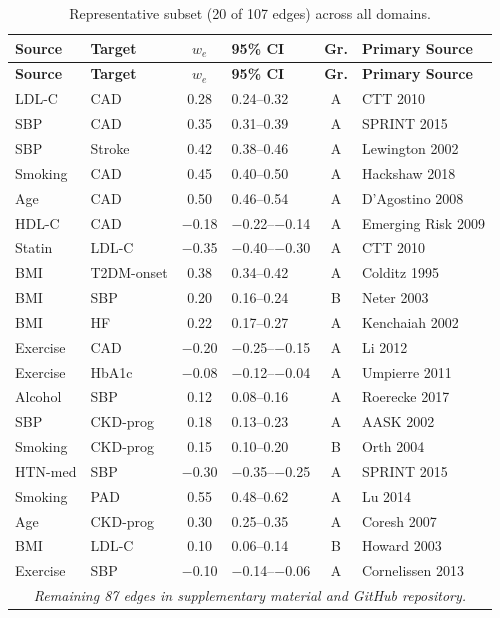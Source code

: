 \documentclass[runningheads]{llncs}
\begin{document}
{\footnotesize
\renewcommand{\arraystretch}{1.05}
\begin{longtable}{@{}p{2.0cm}p{2.0cm}cp{1.4cm}cp{2.8cm}@{}}
\caption{Representative subset (20 of 107 edges) across all domains.}\label{tab:edges}\\
\toprule
\textbf{Source} & \textbf{Target} & \textbf{$w_e$} & \textbf{95\% CI} & \textbf{Gr.} & \textbf{Primary Source} \\
\midrule
\endfirsthead
\toprule
\textbf{Source} & \textbf{Target} & \textbf{$w_e$} & \textbf{95\% CI} & \textbf{Gr.} & \textbf{Primary Source} \\
\midrule
\endhead
\bottomrule
\endlastfoot
LDL-C & CAD & 0.28 & 0.24--0.32 & A & CTT 2010 \\
SBP & CAD & 0.35 & 0.31--0.39 & A & SPRINT 2015 \\
SBP & Stroke & 0.42 & 0.38--0.46 & A & Lewington 2002 \\
Smoking & CAD & 0.45 & 0.40--0.50 & A & Hackshaw 2018 \\
Age & CAD & 0.50 & 0.46--0.54 & A & D'Agostino 2008 \\
HDL-C & CAD & $-$0.18 & $-$0.22--$-$0.14 & A & Emerging Risk 2009 \\
Statin & LDL-C & $-$0.35 & $-$0.40--$-$0.30 & A & CTT 2010 \\
BMI & T2DM-onset & 0.38 & 0.34--0.42 & A & Colditz 1995 \\
BMI & SBP & 0.20 & 0.16--0.24 & B & Neter 2003 \\
BMI & HF & 0.22 & 0.17--0.27 & A & Kenchaiah 2002 \\
Exercise & CAD & $-$0.20 & $-$0.25--$-$0.15 & A & Li 2012 \\
Exercise & HbA1c & $-$0.08 & $-$0.12--$-$0.04 & A & Umpierre 2011 \\
Alcohol & SBP & 0.12 & 0.08--0.16 & A & Roerecke 2017 \\
SBP & CKD-prog & 0.18 & 0.13--0.23 & A & AASK 2002 \\
Smoking & CKD-prog & 0.15 & 0.10--0.20 & B & Orth 2004 \\
HTN-med & SBP & $-$0.30 & $-$0.35--$-$0.25 & A & SPRINT 2015 \\
Smoking & PAD & 0.55 & 0.48--0.62 & A & Lu 2014 \\
Age & CKD-prog & 0.30 & 0.25--0.35 & A & Coresh 2007 \\
BMI & LDL-C & 0.10 & 0.06--0.14 & B & Howard 2003 \\
Exercise & SBP & $-$0.10 & $-$0.14--$-$0.06 & A & Cornelissen 2013 \\
\midrule
\multicolumn{6}{c}{\small\itshape Remaining 87 edges in supplementary material and GitHub repository.} \\
\end{longtable}
}
\end{document}
